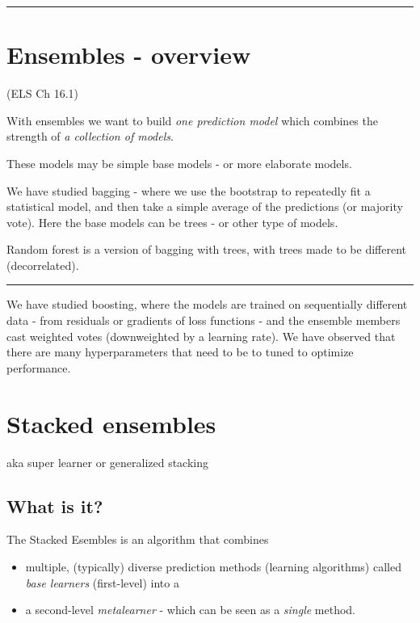 \documentclass[
  letterpaper,
  DIV=11,
  numbers=noendperiod]{scrartcl}
\providecommand{\tightlist}{%
  \setlength{\itemsep}{0pt}\setlength{\parskip}{0pt}}\usepackage{longtable,booktabs,array}
\begin{document}
\begin{center}\rule{0.5\linewidth}{0.5pt}\end{center}

\hypertarget{ensembles---overview}{%
\section{Ensembles - overview}\label{ensembles---overview}}

(ELS Ch 16.1)

With ensembles we want to build \emph{one prediction model} which
combines the strength of \emph{a collection of models}.

These models may be simple base models - or more elaborate models.

We have studied bagging - where we use the bootstrap to repeatedly fit a
statistical model, and then take a simple average of the predictions (or
majority vote). Here the base models can be trees - or other type of
models.

Random forest is a version of bagging with trees, with trees made to be
different (decorrelated).

\begin{center}\rule{0.5\linewidth}{0.5pt}\end{center}

We have studied boosting, where the models are trained on sequentially
different data - from residuals or gradients of loss functions - and the
ensemble members cast weighted votes (downweighted by a learning rate).
We have observed that there are many hyperparameters that need to be to
tuned to optimize performance.

\hypertarget{stacked-ensembles}{%
\section{Stacked ensembles}\label{stacked-ensembles}}

aka super learner or generalized stacking

\hypertarget{what-is-it}{%
\subsection{What is it?}\label{what-is-it}}

The Stacked Esembles is an algorithm that combines

\begin{itemize}
\tightlist
\item
  multiple, (typically) diverse prediction methods (learning algorithms)
  called \emph{base learners} (first-level) into a
\item
  a second-level \emph{metalearner} - which can be seen as a
  \emph{single} method.
\end{itemize}
\end{document}
